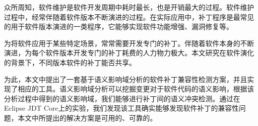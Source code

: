 

\begin{cabstract} 
	众所周知，软件维护是软件开发周期中耗时最长，也是开销最大的过程。软件维护过程中，经常伴随着软件版本不断演进的过程。在实际应用中，补丁程序是最常见的用于软件版本演进的一类程序，它能够实现软件功能增强、漏洞修复等。
	
	为将软件应用于某些特定场景，常常需要开发专门的补丁。伴随着软件本身的不断演进，为每个软件版本开发专门的补丁耗费的人力物力极大。本文研究在软件演化的背景下，不同版本软件的补丁能否共享。
	
	为此，本文中提出了一套基于语义影响域分析的软件补丁兼容性检测方案，并且实现了相应的工具。语义影响域分析可以挖掘变更对于软件代码的语义影响，根据该分析过程中得到的语义影响域，我们能够进行补丁间的语义冲突检测。通过在Eclipse JDT Core上的实验，我们发现该工具确实能够发现软件补丁的兼容性问题，本文中所提出的解决方案是可用的、可靠的。
\end{cabstract}
